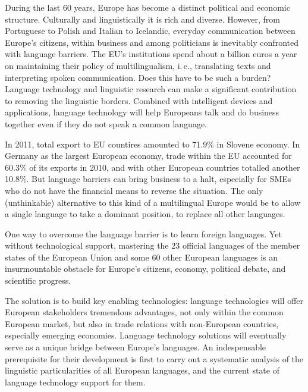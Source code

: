 \cleardoublepage



\begin{multicols}{2}

During the last 60 years, Europe has become a distinct political and economic structure. Culturally and linguistically it is rich and diverse. However, from Portuguese to Polish and Italian to Icelandic, everyday communication between Europe’s citizens, within business and among politicians is inevitably confronted with language barriers. The EU's institutions spend about a billion euros a year on maintaining their policy of multilingualism, i.\,e., translating texts and interpreting spoken communication. Does this have to be such a burden? Language technology and linguistic research can make a significant contribution to removing the linguistic borders. Combined with intelligent devices and applications, language technology will help Europeans talk and do business together even if they do not speak a common language. 

In 2011, total export to EU countires amounted to 71.9\%  in Slovene economy. In Germany as the largest European economy, trade within the EU accounted for 60.3\% of its exports in 2010, and with other European countries totalled another 10.8\%. But language barriers can bring business to a halt, especially for SMEs who do not have the financial means to reverse the situation. The only (unthinkable) alternative to this kind of a multilingual Europe would be to allow a single language to take a dominant position, to replace all other languages. 

One way to overcome the language barrier is to learn foreign languages. Yet without technological support, mastering the 23 official languages of the member states of the European Union and some 60 other European languages is an insurmountable obstacle for Europe’s citizens, economy, political debate, and scientific progress. 

The solution is to build key enabling technologies: language technologies will offer European stakeholders tremendous advantages, not only within the common European market, but also in trade relations with non-European countries, especially emerging economies. Language technology solutions will eventually serve as a unique bridge between Europe's languages. An indespensable prerequisite for their development is first to carry out a systematic analysis of the linguistic particularities of all European languages, and the current state of language technology support for them.


\end{multicols}
